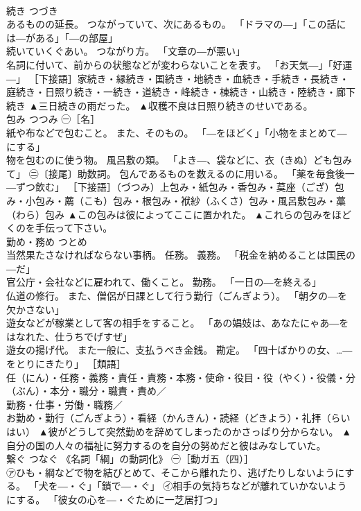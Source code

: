 \documentclass[8pt]{extreport}
\begin{document}
\begin{CJK}{UTF8}{min}
\\	続き	つづき	
\\	あるものの延長。 つながっていて、次にあるもの。 「ドラマの―」「この話には―がある」「―の部屋」 
\\	続いていくぐあい。 つながり方。 「文章の―が悪い」 
\\	名詞に付いて、前からの状態などが変わらないことを表す。 「お天気―」「好運―」 ［下接語］家続き・縁続き・国続き・地続き・血続き・手続き・長続き・庭続き・日照り続き・一続き・道続き・峰続き・棟続き・山続き・陸続き・廊下続き	▲三日続きの雨だった。 ▲収穫不良は日照り続きのせいである。
\\	包み	つつみ	㊀［名］ 
\\	紙や布などで包むこと。 また、そのもの。 「―をほどく」「小物をまとめて―にする」 
\\	物を包むのに使う物。 風呂敷の類。 「よき―、袋などに、衣（きぬ）ども包みて」 ㊁〔接尾〕助数詞。 包んであるものを数えるのに用いる。 「薬を毎食後一―ずつ飲む」 ［下接語］（づつみ）上包み・紙包み・香包み・茣座（ござ）包み・小包み・薦（こも）包み・根包み・袱紗（ふくさ）包み・風呂敷包み・藁（わら）包み	▲この包みは彼によってここに置かれた。 ▲これらの包みをほどくのを手伝って下さい。
\\	勤め・務め	つとめ	
\\	当然果たさなければならない事柄。 任務。 義務。 「税金を納めることは国民の―だ」 
\\	官公庁・会社などに雇われて、働くこと。 勤務。 「一日の―を終える」 
\\	仏道の修行。 また、僧侶が日課として行う勤行（ごんぎよう）。 「朝夕の―を欠かさない」 
\\	遊女などが稼業として客の相手をすること。 「あの娼妓は、あなたにゃあ―をはなれた、仕うちでげすぜ」 
\\	遊女の揚げ代。 また一般に、支払うべき金銭。 勘定。 「四十ばかりの女、…―をとりにきたり」 ［類語］
\\	任（にん）・任務・義務・責任・責務・本務・使命・役目・役（やく）・役儀・分（ぶん）・本分・職分・職責・責め／
\\	勤務・仕事・労働・職務／
\\	お勤め・勤行（ごんぎよう）・看経（かんきん）・読経（どきよう）・礼拝（らいはい）	▲彼がどうして突然勤めを辞めてしまったのかさっぱり分からない。 ▲自分の国の人々の福祉に努力するのを自分の努めだと彼はみなしていた。
\\	繋ぐ	つなぐ	《名詞「綱」の動詞化》 ㊀［動ガ五（四）］ 
\\	㋐ひも・綱などで物を結びとめて、そこから離れたり、逃げたりしないようにする。 「犬を―・ぐ」「鎖で―・ぐ」 ㋑相手の気持ちなどが離れていかないようにする。 「彼女の心を―・ぐために一芝居打つ」 

\end{CJK}
\end{document}
